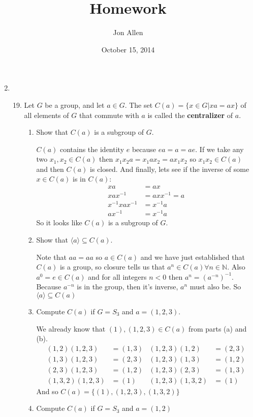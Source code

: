 \documentclass[letterpaper]{article}
\begin{document}
\title{Homework}
\date{October 15, 2014}
\author{Jon Allen}
\maketitle

\renewcommand{\labelenumi}{3.\arabic{enumi}}
\renewcommand{\labelenumii}{\arabic{enumii}.}
\renewcommand{\labelenumiii}{(\alph{enumiii})}
\begin{enumerate}
\setcounter{enumi}{1}
\item
  \begin{enumerate}
  \setcounter{enumii}{18}
  \item
    Let $G$ be a group, and let $a\in G$. The set $C(a)=\{x\in G|xa=ax\}$ of all elements of $G$ that commute with $a$ is called the {\bfseries centralizer} of $a$.
    \begin{enumerate}
    \item
      Show that $C(a)$ is a subgroup of $G$.

      $C(a)$ contains the identity $e$ because $ea=a=ae$. If we take any two $x_1,x_2\in C(a)$ then $x_1x_2a=x_1ax_2=ax_1x_2$ so $x_1x_2\in C(a)$ and then $C(a)$ is closed. And finally, lets see if the inverse of some $x\in C(a)$ is in $C(a)$:
      \begin{align*}
        xa&=ax\\
        xax^{-1}&=axx^{-1}=a\\
        x^{-1}xax^{-1}&=x^{-1}a\\
        ax^{-1}&=x^{-1}a
      \end{align*}
    So it looks like $C(a)$ is a subgroup of $G$.
    \item
      Show that $\langle a\rangle\subseteq C(a)$.

      Note that $aa=aa$ so $a\in C(a)$ and we have just established that $C(a)$ is a group, so closure tells us that $a^n\in C(a)\forall n\in\mathbb{N}$. Also $a^0=e\in C(a)$ and for all integers $n<0$ then $a^n=(a^{-n})^{-1}$. Because $a^{-n}$ is in the group, then it's inverse, $a^{n}$ must also be. So $\langle a\rangle\subseteq C(a)$
    \item
      Compute $C(a)$ if $G=S_3$ and $a=(1,2,3)$.

      We already know that $(1),(1,2,3)\in C(a)$ from parts (a) and (b).
      \begin{align*}
        (1,2)(1,2,3)&=(1,3)&(1,2,3)(1,2)&=(2,3)\\
        (1,3)(1,2,3)&=(2,3)&(1,2,3)(1,3)&=(1,2)\\
        (2,3)(1,2,3)&=(1,2)&(1,2,3)(2,3)&=(1,3)\\
        (1,3,2)(1,2,3)&=(1)&(1,2,3)(1,3,2)&=(1)
      \end{align*}
      And so $C(a)=\{(1),(1,2,3),(1,3,2)\}$
    \item
      Compute $C(a)$ if $G=S_3$ and $a=(1,2)$


\end{enumerate}
\end{enumerate}
\end{enumerate}
\end{document}
